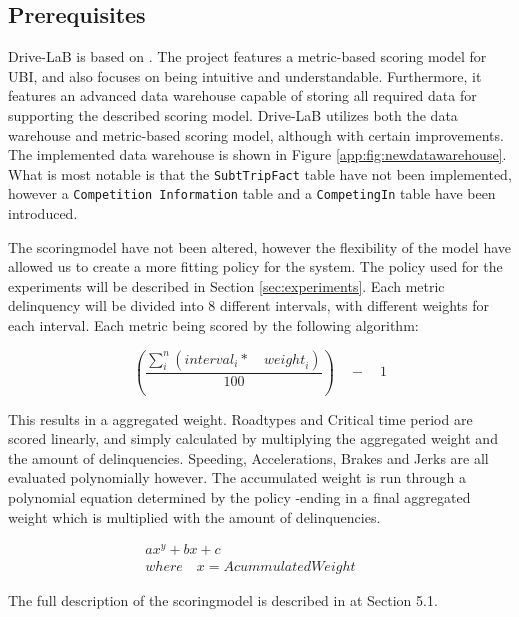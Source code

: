 \subsection{Prerequisites}\label{subsec:prereq}
Drive-LaB is based on \citep{sw9_report}. The project features a metric-based scoring model for UBI, and also focuses on being intuitive and understandable. Furthermore, it features an advanced data warehouse capable of storing all required data for supporting the described scoring model. Drive-LaB utilizes both the data warehouse and metric-based scoring model, although with certain improvements. The implemented data warehouse is shown in Figure \ref{app:fig:newdatawarehouse}. What is most notable is that the \texttt{SubtTripFact} table have not been implemented, however a \texttt{Competition Information} table and a \texttt{CompetingIn} table have been introduced.

The scoringmodel have not been altered, however the flexibility of the model have allowed us to create a more fitting policy for the system. The policy used for the experiments will be described in Section \ref{sec:experiments}. Each metric delinquency will be divided into 8 different intervals, with different weights for each interval. Each metric being scored by the following algorithm:

$$
\left( \frac { \sum _{ i }^{ n }{ \left( { interval }_{ i }*\quad { weight }_{ i } \right)  }  }{ 100 }  \right) \quad -\quad 1
$$

This results in a aggregated weight. Roadtypes and Critical time period are scored linearly, and simply calculated by multiplying the aggregated weight and the amount of delinquencies. Speeding, Accelerations, Brakes and Jerks are all evaluated polynomially however. The accumulated weight is run through a polynomial equation determined by the policy -ending in a final aggregated weight which is multiplied with the amount of delinquencies.

\begin{align*}
ax^{y} + bx + c\quad \quad \quad \quad \quad \quad \quad \quad \quad \quad \quad \\
where\quad x = AcummulatedWeight
\end{align*}

The full description of the scoringmodel is described in \citep{sw9_report} at Section 5.1.